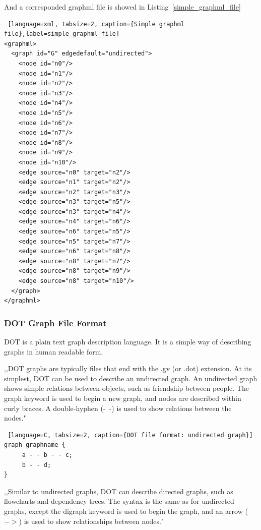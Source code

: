 And a corresponded graphml file is showed in Listing~\ref{simple_graphml_file}

\begin{center}
\begin{lstlisting} [language=xml, tabsize=2, caption={Simple graphml file},label=simple_graphml_file]
<graphml>
  <graph id="G" edgedefault="undirected">
    <node id="n0"/>
    <node id="n1"/>
    <node id="n2"/>
    <node id="n3"/>
    <node id="n4"/>
    <node id="n5"/>
    <node id="n6"/>
    <node id="n7"/>
    <node id="n8"/>
    <node id="n9"/>
    <node id="n10"/>
    <edge source="n0" target="n2"/>
    <edge source="n1" target="n2"/>
    <edge source="n2" target="n3"/>
    <edge source="n3" target="n5"/>
    <edge source="n3" target="n4"/>
    <edge source="n4" target="n6"/>
    <edge source="n6" target="n5"/>
    <edge source="n5" target="n7"/>
    <edge source="n6" target="n8"/>
    <edge source="n8" target="n7"/>
    <edge source="n8" target="n9"/>
    <edge source="n8" target="n10"/>
  </graph>
</graphml>
\end{lstlisting}
\end{center}

\subsubsection{DOT Graph File Format}
DOT is a plain text graph description language. It is a simple way of describing graphs in human readable form.

,,DOT graphs are typically files that end with the .gv (or .dot) extension. At its simplest, DOT can be used to describe an undirected graph. An undirected graph shows simple relations between objects, such as friendship between people. The graph keyword is used to begin a new graph, and nodes are described within curly braces. A double-hyphen (-\ -) is used to show relations between the nodes."~\cite{DOT}

\begin{center}
\begin{lstlisting} [language=C, tabsize=2, caption={DOT file format: undirected graph}]
graph graphname {
     a - - b - - c;
     b - - d;
}
\end{lstlisting}
\end{center}

,,Similar to undirected graphs, DOT can describe directed graphs, such as flowcharts and dependency trees. The syntax is the same as for undirected graphs, except the digraph keyword is used to begin the graph, and an arrow ($->$) is used to show relationships between nodes."~\cite{DOT}

